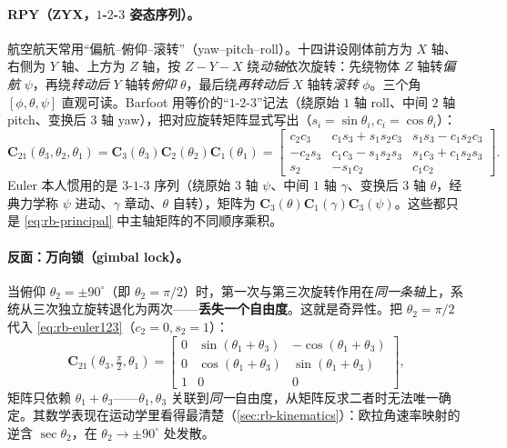 \paragraph{RPY（ZYX，$1$-$2$-$3$ 姿态序列）。}航空航天常用“偏航--俯仰--滚转”（yaw--pitch--roll）。十四讲设刚体前方为 $X$ 轴、右侧为 $Y$ 轴、上方为 $Z$ 轴，按 $Z\!-\!Y\!-\!X$ 绕\emph{动轴}依次旋转：先绕物体 $Z$ 轴转\emph{偏航} $\psi$，再绕\emph{转动后} $Y$ 轴转\emph{俯仰} $\theta$，最后绕\emph{再转动后} $X$ 轴转\emph{滚转} $\phi$。三个角 $[\phi,\theta,\psi]$ 直观可读。Barfoot 用等价的“$1$-$2$-$3$”记法（绕原始 $1$ 轴 roll、中间 $2$ 轴 pitch、变换后 $3$ 轴 yaw），把对应旋转矩阵显式写出\cite{barfoot2024state}（$s_i=\sin\theta_i,c_i=\cos\theta_i$）：
\begin{equation}
  \mathbf{C}_{21}(\theta_3,\theta_2,\theta_1)=\mathbf{C}_3(\theta_3)\mathbf{C}_2(\theta_2)\mathbf{C}_1(\theta_1)
  =\begin{bmatrix}
  c_2c_3 & c_1s_3+s_1s_2c_3 & s_1s_3-c_1s_2c_3\\
  -c_2s_3 & c_1c_3-s_1s_2s_3 & s_1c_3+c_1s_2s_3\\
  s_2 & -s_1c_2 & c_1c_2
  \end{bmatrix}.
  \label{eq:rb-euler123}
\end{equation}
Euler 本人惯用的是 $3$-$1$-$3$ 序列（绕原始 $3$ 轴 $\psi$、中间 $1$ 轴 $\gamma$、变换后 $3$ 轴 $\theta$，经典力学称 $\psi$ 进动、$\gamma$ 章动、$\theta$ 自转），矩阵为 $\mathbf{C}_3(\theta)\mathbf{C}_1(\gamma)\mathbf{C}_3(\psi)$。这些都只是 \cref{eq:rb-principal} 中主轴矩阵的不同顺序乘积。

\paragraph{反面：万向锁（gimbal lock）。}当俯仰 $\theta_2=\pm90^\circ$（即 $\theta_2=\pi/2$）时，第一次与第三次旋转作用在\emph{同一条轴}上，系统从三次独立旋转退化为两次——\textbf{丢失一个自由度}。这就是奇异性。把 $\theta_2=\pi/2$ 代入 \cref{eq:rb-euler123}（$c_2=0,s_2=1$）：
\begin{equation}
  \mathbf{C}_{21}(\theta_3,\tfrac{\pi}{2},\theta_1)=\begin{bmatrix}
  0&\sin(\theta_1+\theta_3)&-\cos(\theta_1+\theta_3)\\
  0&\cos(\theta_1+\theta_3)&\sin(\theta_1+\theta_3)\\
  1&0&0\end{bmatrix},
\end{equation}
矩阵只依赖 $\theta_1+\theta_3$——$\theta_1,\theta_3$ 关联到\emph{同一}自由度，从矩阵反求二者时无法唯一确定\cite{barfoot2024state}。其数学表现在运动学里看得最清楚（\cref{sec:rb-kinematics}）：欧拉角速率映射的逆含 $\sec\theta_2$，在 $\theta_2\to\pm90^\circ$ 处发散。

